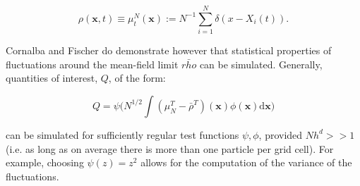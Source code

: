 \begin{equation*}
    \rho(\mathbf{x},t) \equiv \mu_t^N(\mathbf{x}) := N^{-1} \sum_{i=1}^N\delta(x - X_i(t)).
\end{equation*}

Cornalba and Fischer \cite{cornalba2025multilevel} do demonstrate however that
statistical properties of fluctuations 
around the mean-field limit $\bar{rho}$ can be simulated. 
Generally, quantities of interest, $Q$, of the form:

\begin{equation} 
    Q = \psi\big(N^{1/2} \int (\mu_N^T - \bar{\rho}^T)(\mathbf{x})
    \phi(\mathbf{x})\mathrm{d}\mathbf{x}\big)
\end{equation}


can be simulated for sufficiently regular test functions $\psi, \phi$, provided $Nh^d >> 1$
(i.e. as long as on average there is more than one particle per grid cell). 
For example, choosing $\psi(z) = z^2$ allows for the computation of the 
variance of the fluctuations.




